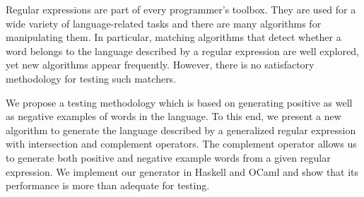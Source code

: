 Regular expressions are part of every programmer's toolbox.  They are
used for a wide variety of language-related tasks and there are many algorithms for
manipulating them. In particular, matching algorithms that detect
whether a word belongs to the language described by a regular
expression are well explored, 
yet new algorithms appear frequently. However, there is
no satisfactory methodology for testing such matchers.

We propose a testing methodology which is based on generating positive
as well as negative examples of words in the language. To this end, we
present a new algorithm to generate the language described by a
generalized regular expression with intersection and complement
operators.  The complement operator allows us to generate both
positive and negative example words from a given regular expression.
We implement our generator in Haskell and OCaml and show that its
performance is more than adequate for testing.

